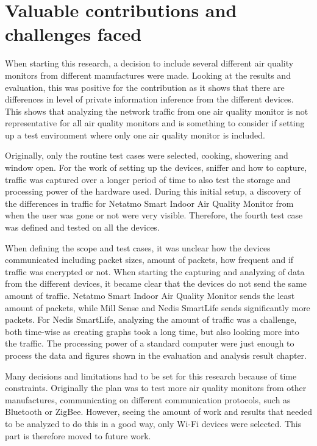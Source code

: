 \section{Valuable contributions and challenges faced}
When starting this research, a decision to include several different air quality monitors from different manufactures were made. Looking at the results and evaluation, this was positive for the contribution as it shows that there are differences in level of private information inference from the different devices. This shows that analyzing the network traffic from one air quality monitor is not representative for all air quality monitors and is something to consider if setting up a test environment where only one air quality monitor is included.

Originally, only the routine test cases were selected, cooking, showering and window open. For the work of setting up the devices, sniffer and how to capture, traffic was captured over a longer period of time to also test the storage and processing power of the hardware used. During this initial setup, a discovery of the differences in traffic for Netatmo Smart Indoor Air Quality Monitor from when the user was gone or not were very visible. Therefore, the fourth test case was defined and tested on all the devices. 

When defining the scope and test cases, it was unclear how the devices communicated including packet sizes, amount of packets, how frequent and if traffic was encrypted or not. When starting the capturing and analyzing of data from the different devices, it became clear that the devices do not send the same amount of traffic. Netatmo Smart Indoor Air Quality Monitor sends the least amount of packets, while Mill Sense and Nedis SmartLife sends significantly more packets. For Nedis SmartLife, analyzing the amount of traffic was a challenge, both time-wise as creating graphs took a long time, but also looking more into the traffic. The processing power of a standard computer were just enough to process the data and figures shown in the evaluation and analysis result chapter. 

Many decisions and limitations had to be set for this research because of time constraints. Originally the plan was to test more air quality monitors from other manufactures, communicating on different communication protocols, such as Bluetooth or ZigBee. However, seeing the amount of work and results that needed to be analyzed to do this in a good way, only \gls{Wi-Fi} devices were selected. This part is therefore moved to future work.  

